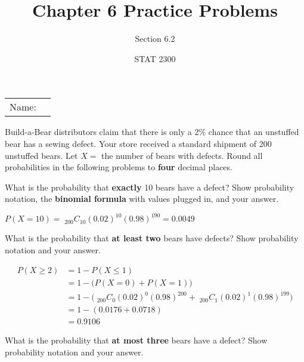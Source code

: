 \documentclass[noanswers]{exam}
\title{Chapter 6 Practice Problems}
\author{Section 6.2}
\date{STAT 2300}
\begin{document}
\noindent\begin{tabular}{@{}p{.3in}p{3in}@{}}
Name: & \hrulefill
\end{tabular}

\vspace{4mm}


\noindent Build-a-Bear distributors claim that there is only a 2\% chance that an unstuffed bear has a sewing defect. Your store received a standard shipment of 200 unstuffed bears. Let $X=$ the number of bears with defects. Round all probabilities in the following problems to \textbf{four} decimal places.
	
	\vspace{3mm}

\begin{questions} 
		
	\question What is the probability that \textbf{exactly} 10 bears have a defect? Show probability notation, the \textbf{binomial formula} with values plugged in, and your answer.
	
	\begin{solution}[\stretch{1}]
	
	\vspace{2mm}

	$P(X=10)=\phantom{!}_{200}C_{10}(0.02)^{10}(0.98)^{190}=0.0049$
	
	\vspace{2mm}

	\end{solution}	
	
	\question What is the probability that \textbf{at least two} bears have defects? Show probability notation and your answer.
	
	\begin{solution}[\stretch{1}]	
	\begin{align*}
	P(X\geq 2) &= 1-P(X\leq 1) \\
	&= 1-\Big(P(X=0)+P(X=1)\Big)\\
	&= 1-\Big(\phantom{!}_{200}C_{0}(0.02)^0(0.98)^{200}+\phantom{!}_{200}C_{1}(0.02)^1(0.98)^{199}\Big)\\
	&= 1 - (0.0176 + 0.0718) \\
	&= 0.9106
	\end{align*}
	\end{solution}	
	
	\question What is the probability that \textbf{at most three} bears have a defect? Show probability notation and your answer.
	
	\begin{solution}[\stretch{1}]
	

\end{solution}
\end{questions}
\end{document}
